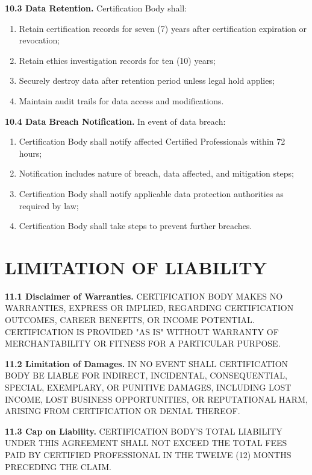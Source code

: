 \documentclass[11pt,a4paper]{article}
\begin{document}
\textbf{10.3 Data Retention.} Certification Body shall:

\begin{enumerate}[label=\alph*)]
\item Retain certification records for seven (7) years after certification expiration or revocation;
\item Retain ethics investigation records for ten (10) years;
\item Securely destroy data after retention period unless legal hold applies;
\item Maintain audit trails for data access and modifications.
\end{enumerate}

\textbf{10.4 Data Breach Notification.} In event of data breach:

\begin{enumerate}[label=\alph*)]
\item Certification Body shall notify affected Certified Professionals within 72 hours;
\item Notification includes nature of breach, data affected, and mitigation steps;
\item Certification Body shall notify applicable data protection authorities as required by law;
\item Certification Body shall take steps to prevent further breaches.
\end{enumerate}

\section{LIMITATION OF LIABILITY}

\textbf{11.1 Disclaimer of Warranties.} CERTIFICATION BODY MAKES NO WARRANTIES, EXPRESS OR IMPLIED, REGARDING CERTIFICATION OUTCOMES, CAREER BENEFITS, OR INCOME POTENTIAL. CERTIFICATION IS PROVIDED "AS IS" WITHOUT WARRANTY OF MERCHANTABILITY OR FITNESS FOR A PARTICULAR PURPOSE.

\textbf{11.2 Limitation of Damages.} IN NO EVENT SHALL CERTIFICATION BODY BE LIABLE FOR INDIRECT, INCIDENTAL, CONSEQUENTIAL, SPECIAL, EXEMPLARY, OR PUNITIVE DAMAGES, INCLUDING LOST INCOME, LOST BUSINESS OPPORTUNITIES, OR REPUTATIONAL HARM, ARISING FROM CERTIFICATION OR DENIAL THEREOF.

\textbf{11.3 Cap on Liability.} CERTIFICATION BODY'S TOTAL LIABILITY UNDER THIS AGREEMENT SHALL NOT EXCEED THE TOTAL FEES PAID BY CERTIFIED PROFESSIONAL IN THE TWELVE (12) MONTHS PRECEDING THE CLAIM.
\end{document}
